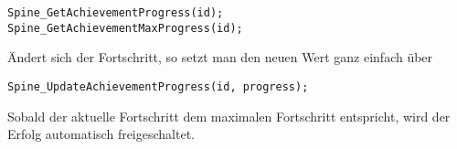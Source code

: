 \documentclass{article}
\begin{document}
\begin{lstlisting}
Spine_GetAchievementProgress(id);
Spine_GetAchievementMaxProgress(id);
\end{lstlisting}

Ändert sich der Fortschritt, so setzt man den neuen Wert ganz einfach über

\begin{lstlisting}
Spine_UpdateAchievementProgress(id, progress);
\end{lstlisting}

Sobald der aktuelle Fortschritt dem maximalen Fortschritt entspricht, wird der Erfolg automatisch freigeschaltet.
\end{document}

